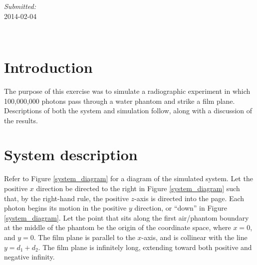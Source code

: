 \documentclass[12pt]{article} %
\begin{document}
\begin{titlepage}

\begin{minipage}{0.4\textwidth}
\begin{center} \large
\emph{Submitted:} \\
2014-02-04 %
\end{center}
\end{minipage}\\[4cm]

\vfill %
\end{titlepage}


\fontsize{12}{20}%
\selectfont

\section*{Introduction}
The purpose of this exercise was to simulate a radiographic experiment in which 100,000,000 photons pass through a water phantom and strike a film plane. Descriptions of both the system and simulation follow, along with a discussion of the results.

\section*{System description}
Refer to Figure \ref{system_diagram} for a diagram of the simulated system. Let the positive $x$ direction be directed to the right in Figure \ref{system_diagram} such that, by the right-hand rule, the positive $z$-axis is directed into the page.
Each photon begins its motion in the positive $y$ direction, or ``down'' in Figure \ref{system_diagram}.
Let the point that sits along the first air/phantom boundary at the middle of the phantom be the origin of the coordinate space, where $x = 0$, and $y = 0$. The film plane is parallel to the $x$-axis, and is collinear with the line $y=d_1 + d_2$. The film plane is infinitely long, extending toward both positive and negative infinity.
\end{document}
